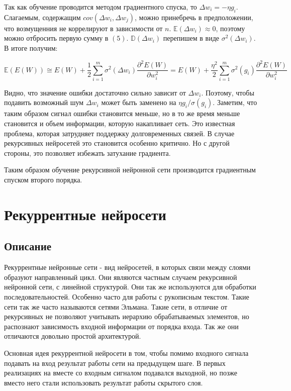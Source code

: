 \documentclass[14pt]{article}
\begin{document}
Так как обучение проводится методом градиентного спуска, то $\Delta w_i = -\eta g_i$.  Слагаемым, содержащим $cov(\Delta w_i, \Delta w_j)$, можно принебречь в предположении, что возмущенния не коррелируют в зависимости от $n$. $\mathbb{E}(\Delta w_i)\approx 0$, поэтому можно отбросить первую сумму в $(5)$. $\mathbb{D}(\Delta w_i)$ перепишем в виде $\sigma^2(\Delta w_i)$. В итоге получим:


\begin{equation}
\mathbb{E}(E(W)) \cong E(W) +
\frac{1}{2}\sum\limits_{i=1}^{m}\sigma^2(\Delta w_i)\frac{\partial^2E(W)}{\partial w_i^2} = E(W) + \frac{\eta^2}{2}\sum\limits_{i=1}^{m}\sigma^2(g_i)\frac{\partial^2E(W)}{\partial w_i^2}
\end{equation}


Видно, что значение ошибки достаточно сильно зависит от $\Delta w_i$. Поэтому, чтобы подавить возможный шум $\Delta w_i$ может быть заменено на $\eta g_i / \sigma(g_i)$. Заметим, что таким образом сигнал ошибки становится меньше, но в то же время меньше становится и объем информации, которую накапливает сеть. Это известная проблема, которая затрудняет поддержку долговременных связей. В случае рекурсивных нейросетей это становится особенно критично. Но с другой стороны, это позволяет избежать затухание градиента.


Таким образом обучение рекурсивной нейронной сети производится градиентным спуском второго порядка.
\section{Рекуррентные нейросети}

\subsection{Описание}
Рекуррентные нейронные сети - вид нейросетей, в которых связи между слоями образуют направленный цикл. Они являются частным случаем рекурсивной нейронной сети, с линейной структурой. Они так же используются для обработки последовательностей. Особенно часто для работы с рукописным текстом. Такие сети так же часто называются сетями Эльмана. Такие сети, в отличие от рекурсивных не позволяют учитывать иерархию обрабатываемых элементов, но распознают зависимость входной информации от порядка входа. Так же они отличаются довольно простой архитектурой.


Основная идея рекуррентной нейросети в том, чтобы помимо входного сигнала подавать на вход результат работы сети на предыдущем шаге. В первых реализациях на вместе со входным сигналом подавался выходной, но позже вместо него стали использовать результат работы скрытого слоя.
\end{document}
